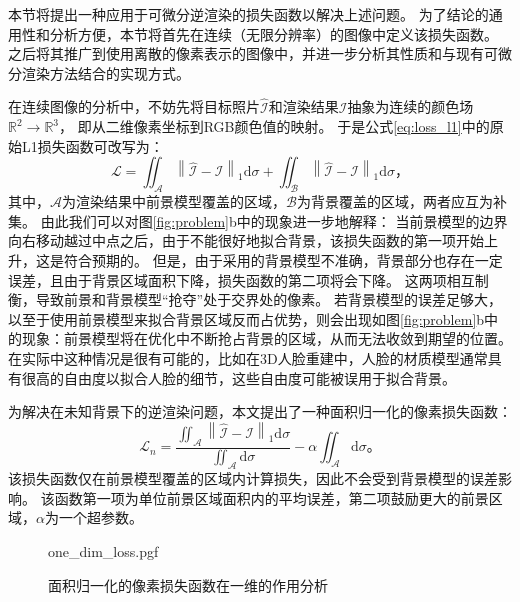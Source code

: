 本节将提出一种应用于可微分逆渲染的损失函数以解决上述问题。
为了结论的通用性和分析方便，本节将首先在连续（无限分辨率）的图像中定义该损失函数。
之后将其推广到使用离散的像素表示的图像中，并进一步分析其性质和与现有可微分渲染方法结合的实现方式。

在连续图像的分析中，不妨先将目标照片$\hat{\mathcal{I}}$和渲染结果$\mathcal{I}$抽象为连续的颜色场$\mathbb{R}^2 \to \mathbb{R}^3$，
即从二维像素坐标到RGB颜色值的映射。
于是公式\eqref{eq:loss_l1}中的原始L1损失函数可改写为：
\begin{equation}
\mathcal{L} = \iint_{\mathcal{A}} \left\| \hat{\mathcal{I}} - \mathcal{I} \right\|_1 \mathrm{d}\sigma +
\iint_{\mathcal{B}} \left\| \hat{\mathcal{I}} - \mathcal{I} \right\|_1 \mathrm{d}\sigma
\text{，}
\label{eq:loss_l1_area}
\end{equation}
其中，$\mathcal{A}$为渲染结果中前景模型覆盖的区域，$\mathcal{B}$为背景覆盖的区域，两者应互为补集。
由此我们可以对图\ref{fig:problem}b中的现象进一步地解释：
当前景模型的边界向右移动越过中点之后，由于不能很好地拟合背景，该损失函数的第一项开始上升，这是符合预期的。
但是，由于采用的背景模型不准确，背景部分也存在一定误差，且由于背景区域面积下降，损失函数的第二项将会下降。
这两项相互制衡，导致前景和背景模型“抢夺”处于交界处的像素。
若背景模型的误差足够大，以至于使用前景模型来拟合背景区域反而占优势，则会出现如图\ref{fig:problem}b中的现象：前景模型将在优化中不断抢占背景的区域，从而无法收敛到期望的位置。
在实际中这种情况是很有可能的，比如在3D人脸重建中，人脸的材质模型通常具有很高的自由度以拟合人脸的细节，这些自由度可能被误用于拟合背景。

为解决在未知背景下的逆渲染问题，本文提出了一种面积归一化的像素损失函数：
\begin{equation}
\mathcal{L}_n = \frac{\iint_{\mathcal{A}} \left\| \hat{\mathcal{I}} - \mathcal{I} \right\|_1 \mathrm{d}\sigma}
{\iint_{\mathcal{A}}\mathrm{d}\sigma}
-\alpha\iint_{\mathcal{A}}\mathrm{d}\sigma
\text{。}
\label{eq:loss_n}
\end{equation}
该损失函数仅在前景模型覆盖的区域内计算损失，因此不会受到背景模型的误差影响。
该函数第一项为单位前景区域面积内的平均误差，第二项鼓励更大的前景区域，$\alpha$为一个超参数。

\begin{figure}
\centering
{one_dim_loss.pgf}
\caption{面积归一化的像素损失函数在一维的作用分析}
\label{fig:one_dim_loss}
\end{figure}

